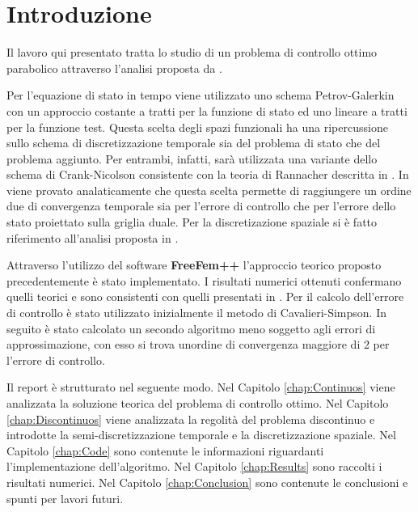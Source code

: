 \chapter{Introduzione}

Il lavoro qui presentato tratta lo studio di un problema di controllo ottimo parabolico attraverso l'analisi proposta da \cite{MAIN}.
\par\medskip
Per l'equazione di stato in tempo viene utilizzato uno schema Petrov-Galerkin con un approccio costante a tratti per la funzione di stato ed uno lineare a tratti per la funzione test. Questa scelta degli spazi funzionali ha una ripercussione sullo schema di discretizzazione temporale sia del problema di stato che del problema aggiunto. Per entrambi, infatti, sarà utilizzata una variante dello schema di Crank-Nicolson consistente con la teoria di Rannacher descritta in \cite{Ran84}.
In \cite{MAIN} viene provato analaticamente che questa scelta permette di raggiungere un ordine due di convergenza temporale sia per l'errore di controllo che per l'errore dello stato proiettato sulla griglia duale.
Per la discretizazione spaziale si è fatto riferimento all'analisi proposta in \cite{MV11}.
\par\medskip
Attraverso l'utilizzo del software \textbf{FreeFem++} l'approccio teorico proposto precedentemente è stato implementato. I risultati numerici ottenuti confermano quelli teorici e sono consistenti con quelli presentati in \cite{MAIN}. Per il calcolo dell'errore di controllo è stato utilizzato inizialmente il metodo di Cavalieri-Simpson. In seguito è stato calcolato un secondo algoritmo meno soggetto agli errori di approssimazione, con esso si trova unordine di convergenza maggiore di 2 per l'errore di controllo.
\par\medskip
Il report è strutturato nel seguente modo. Nel Capitolo \ref{chap:Continuos} viene analizzata la soluzione teorica del problema di controllo ottimo. Nel Capitolo \ref{chap:Discontinuos} viene analizzata la regolità del problema discontinuo e introdotte la semi-discretizzazione temporale e la discretizzazione spaziale. Nel Capitolo \ref{chap:Code} sono contenute le informazioni riguardanti l'implementazione dell'algoritmo. Nel Capitolo \ref{chap:Results} sono raccolti i risultati numerici. Nel Capitolo \ref{chap:Conclusion} sono contenute le conclusioni e spunti per lavori futuri.